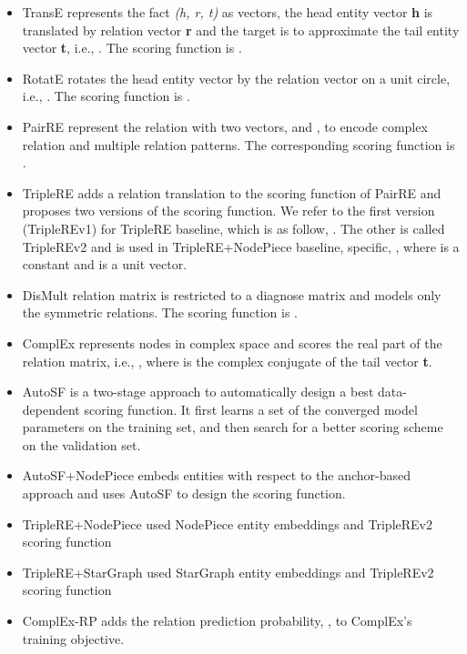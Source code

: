 \documentclass[11pt]{article}
\begin{document}
\begin{itemize}
    \item TransE \cite{bordes2013translating} represents the fact \emph{(h, r, t)} as vectors, the head entity vector \textbf{h} is translated by relation vector \textbf{r} and the target is to approximate the tail entity vector \textbf{t}, i.e., . The scoring function is .
    \item RotatE\cite{sun2019rotate} rotates the head entity vector by the relation vector on a unit circle, i.e., . The scoring function is .
    \item PairRE \cite{chao2020pairre} represent the relation with two vectors,  and , to encode complex relation and multiple relation patterns. The corresponding scoring function is .
    \item TripleRE \cite{long2021triplere} adds a relation translation to the scoring function of PairRE and proposes two versions of the scoring function. We refer to the first version (TripleREv1) for TripleRE baseline, which is as follow, . The other is called TripleREv2 and is used in TripleRE+NodePiece baseline, specific, , where  is a constant and  is a unit vector. 
    \item DisMult \cite{yang2014embedding} relation matrix  is restricted to a diagnose matrix and models only the symmetric relations. The scoring function is .
    \item ComplEx \cite{trouillon2016complex} represents nodes in complex space and scores the real part of the relation matrix, i.e., , where  is the complex conjugate of the tail vector \textbf{t}. 
    \item AutoSF \cite{zhang2020autosf} is a two-stage approach to automatically design a best data-dependent scoring function. It first learns a set of the converged model parameters on the training set, and then search for a better scoring scheme on the validation set.
    \item AutoSF+NodePiece embeds entities with respect to the anchor-based approach and uses AutoSF to design the scoring function.
    \item TripleRE+NodePiece used NodePiece entity embeddings and TripleREv2 scoring function
    \item TripleRE+StarGraph used StarGraph entity embeddings and TripleREv2 scoring function
    \item ComplEx-RP adds the relation prediction probability, , to ComplEx's training objective.
\end{itemize}
\end{document}
